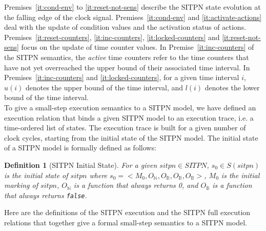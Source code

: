 \documentclass[pdflatex,sn-mathphys]{sn-jnl}%
\theoremstyle{thmstyleone}%
\theoremstyle{thmstyletwo}%
\theoremstyle{thmstylethree}%
\newtheorem{definition}{Definition}%
\begin{document}
Premises~\ref{it:cond-env} to \ref{it:reset-not-sens} describe the
SITPN state evolution at the falling edge of the clock
signal. Premises~\ref{it:cond-env} and \ref{it:activate-actions} deal
with the update of condition values and the activation status of
actions.  Premises~\ref{it:reset-counters}, \ref{it:inc-counters},
\ref{it:locked-counters} and \ref{it:reset-not-sens} focus on the
update of time counter values.  In Premise~\ref{it:inc-counters} of
the SITPN semantics, the \emph{active} time counters refer to the time
counters that have not yet overreached the upper bound of their
associated time interval. %
In Premises~\ref{it:inc-counters} and
\ref{it:locked-counters}, for a given time interval $i$, $u(i)$
denotes the upper bound of the time interval, and $l(i)$ denotes the
lower bound of the time interval.\\

To give a small-step execution semantics to a SITPN model, we have
defined an execution relation that binds a given SITPN model to an
execution trace, i.e. a time-ordered list of states. The execution
trace is built for a given number of clock cycles, starting from the
initial state of the SITPN model.  The initial state of a SITPN model
is formally defined as follows:

\begin{definition}[SITPN Initial State]
  \label{def:sitpn-init-state}
  For a given $sitpn\in{}SITPN$, $s_0\in{}S(sitpn)$ is the initial
  state of $sitpn$ where
  ${s_0=<M_0,O_\mathbb{N},O_\mathbb{B},O_\mathbb{B},O_\mathbb{B}>}$,
  $M_0$ is the initial marking of $sitpn$, $O_\mathbb{N}$ is a
  function that always returns 0, and $O_\mathbb{B}$ is a function
  that always returns \texttt{false}.
\end{definition}

Here are the definitions of the SITPN execution and the SITPN full
execution relations that together give a formal small-step semantics
to a SITPN model.
\end{document}
